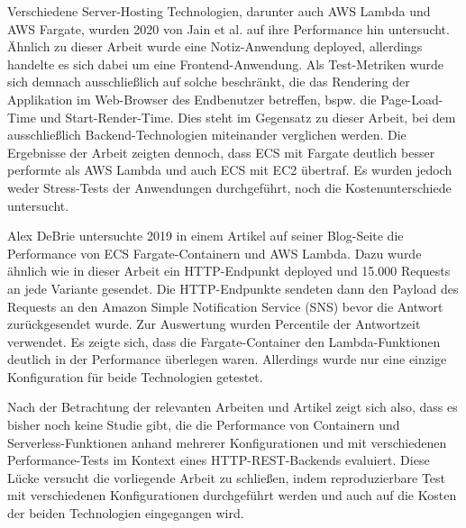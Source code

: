 Verschiedene Server-Hosting Technologien, darunter auch \ac{AWS} Lambda und \ac{AWS} Fargate, wurden 2020 von Jain et al. auf ihre Performance hin untersucht\cite{jain_performance_2020}. Ähnlich zu dieser Arbeit wurde eine Notiz-Anwendung deployed, allerdings handelte es sich dabei um eine Frontend-Anwendung. Als Test-Metriken wurde sich demnach ausschließlich auf solche beschränkt, die das Rendering der Applikation im Web-Browser des Endbenutzer betreffen, bspw. die Page-Load-Time und Start-Render-Time. Dies steht im Gegensatz zu dieser Arbeit, bei dem ausschließlich Backend-Technologien miteinander verglichen werden. Die Ergebnisse der Arbeit zeigten dennoch, dass \ac{ECS} mit Fargate deutlich besser performte als \ac{AWS} Lambda und auch \ac{ECS} mit \ac{EC2} übertraf. Es wurden jedoch weder Stress-Tests der Anwendungen durchgeführt, noch die Kostenunterschiede untersucht.

Alex DeBrie untersuchte 2019 in einem Artikel auf seiner Blog-Seite die Performance von \ac{ECS} Fargate-Containern und \ac{AWS} Lambda\cite{debrie_aws_2019}. Dazu wurde ähnlich wie in dieser Arbeit ein HTTP-Endpunkt deployed und 15.000 Requests an jede Variante gesendet. Die HTTP-Endpunkte sendeten dann den Payload des Requests an den Amazon Simple Notification Service (SNS) bevor die Antwort zurückgesendet wurde. Zur Auswertung wurden Percentile der Antwortzeit verwendet. Es zeigte sich, dass die Fargate-Container den Lambda-Funktionen deutlich in der Performance überlegen waren. Allerdings wurde nur eine einzige Konfiguration für beide Technologien getestet.

Nach der Betrachtung der relevanten Arbeiten und Artikel zeigt sich also, dass es bisher noch keine Studie gibt, die die Performance von Containern und Serverless-Funktionen anhand mehrerer Konfigurationen und mit verschiedenen Performance-Tests im Kontext eines HTTP-REST-Backends evaluiert. Diese Lücke versucht die vorliegende Arbeit zu schließen, indem reproduzierbare Test mit verschiedenen Konfigurationen durchgeführt werden und auch auf die Kosten der beiden Technologien eingegangen wird.